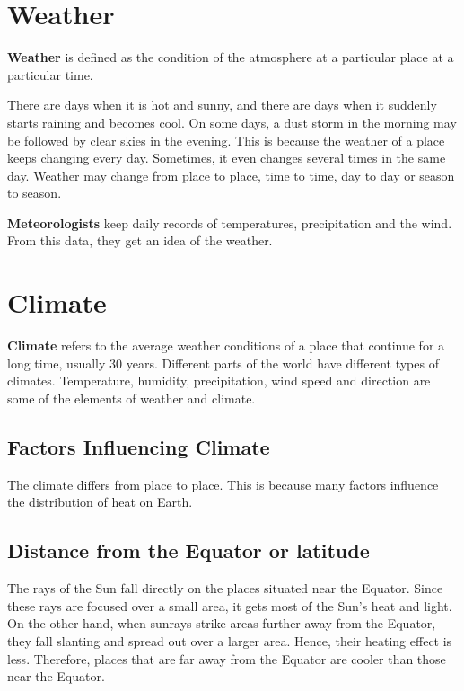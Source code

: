 \section{Weather}
\textbf{Weather}
is defined as the condition of the atmosphere at a particular place at a particular time.
\vspace{0.1in}
\par
There are days when it is hot and sunny, and there are days when it suddenly starts raining and becomes cool. On some days, a dust storm in the morning may be followed by clear skies in the evening. This is because the weather of a place keeps changing every day. Sometimes, it even changes several times in the same day. Weather may change from place to place, time to time, day to day or season to season.
\vspace{0.1in}
\par
\textbf{Meteorologists} keep daily records of temperatures, precipitation and the wind. From this data, they get an idea of the weather.
\section{Climate}
\textbf{Climate} refers to the average weather conditions of a place that continue for a long time, usually 30 years. Different parts of the world have different types of climates. Temperature, humidity, precipitation, wind speed and direction are some of the elements of weather and climate.
\subsection{Factors Influencing Climate}
The climate differs from place to place. This is because many factors influence the distribution of heat on Earth.
\subsection{\textbf{Distance from the Equator or latitude}}
The rays of the Sun fall directly on the places situated near the Equator. Since these rays are focused over a small area, it gets most of the Sun's heat and light. On the other hand, when sunrays strike areas further away from the Equator, they fall slanting and spread out over a larger area. Hence, their heating effect is less. Therefore, places that are far away from the Equator are cooler than those near the Equator.

